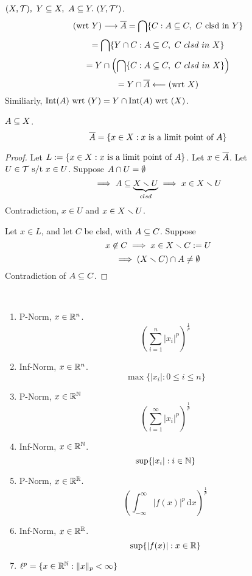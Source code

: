 \documentclass[12pt]{article}
\begin{document}
\bboxnote
\begin{note}
    \((X,\TT),\ Y\ssq X,\ A\ssq Y.\ (Y,\TT')\).
    \[
        (\T{wrt}\ Y)\longrightarrow\cls A
        = \bigintr\{
            C : A\ssq C,\ C\ \TR{clsd\ in}\ Y
        \}
    \]
    \[
        =\bigcap\{
            Y\cap C : A\subseteq C,\ C\ clsd\ in\ X
        \}
    \]
    \[
        =Y\cap\left(
            \bigcap\{
                C : A \subseteq C,\ C\ clsd\ in\ X
            \}
        \right)
    \]
    \[
        = Y \cap \overline{A}\longleftarrow(\text{wrt }X)
    \]
    Similiarly, \(\mathrm{Int}(A)\text{ wrt }(Y)=Y \cap \mathrm{Int}(A)\text{ wrt }(X)\).
\end{note}
\ebox

\bboxprop
\begin{prop}
    \(A\subseteq X\).
    \[
        \overline{A} = \{
            x \in X : x \text{ is a limit point of }A
        \}
    \]
\end{prop}
\ebox

\bboxproof
\begin{proof}
    Let \(L:=\{
        x \in X : x\text{ is a limit point of }A
    \}\). Let \(x\in\overline{A}\). Let \(U\in\mathcal T\text{ s/t } x\in U\).
    Suppose \(A\cap U=\emptyset\)
    \[
        \implies A\subseteq\underset{clsd}{\underbrace{
                X\smallsetminus U
        }}\implies x\in X\smallsetminus U
    \]
    Contradiction, \(x\in U\) and \(x\in X\smallsetminus U\).

    Let \(x\in L\), and let \(C\) be clsd, with \(A\subseteq C\).
    Suppose
    \[
        x\not\in C\implies x\in X\smallsetminus C:=U
    \]
    \[
        \implies(X \smallsetminus C)\cap A \neq \emptyset
    \]
    Contradiction of \(A\subseteq C\).
\end{proof}
\ebox


\bboxnote
\begin{note}[Norms]\ 
    \begin{enumerate}
        \item P-Norm, \(x\in\mathbb R^n\).
            \[
                \left(
                    \sum_{i=1}^n|x_i|^p
                \right)^{\frac1p}
            \]
        \item Inf-Norm, \(x\in\mathbb R^n\).
            \[
                \max\{|x_i| : 0 \le i \le n\}
            \]
        \item P-Norm, \(x\in\mathbb R^\mathbb N\)
            \[
                \left(
                    \sum_{i=1}^\infty|x_i|^p
                \right)^{\frac1p}
            \]
        \item Inf-Norm, \(x\in\mathbb R^\mathbb N\).
            \[
                \sup\{|x_i|:i\in\mathbb N\}
            \]
        \item P-Norm, \(x\in\mathbb R^\mathbb R\).
            \[
                \left(
                    \int_{-\infty}^\infty|f(x)|^p\,\mathrm dx
                \right)^{\frac1p}
            \]
        \item Inf-Norm, \(x\in\mathbb R^\mathbb R\).
            \[
                \sup\{|f(x)|:x\in\mathbb R\}
            \]
        \item \(\ell^p=\{x\in\mathbb R^\mathbb N : \|x\|_p<\infty\}\)
    \end{enumerate}
\end{note}
\ebox
\end{document}
